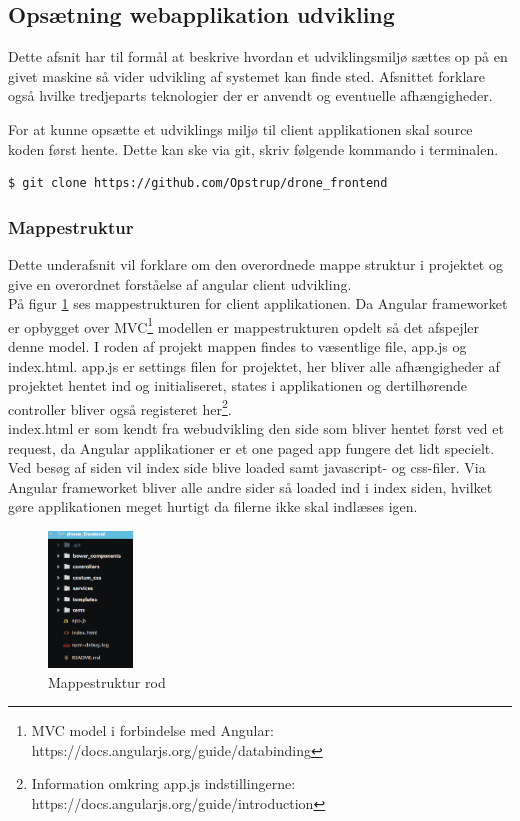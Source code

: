 \subsection{Opsætning webapplikation udvikling}
Dette afsnit har til formål at beskrive hvordan et udviklingsmiljø sættes op på en givet maskine så vider udvikling af systemet kan finde sted. Afsnittet forklare også hvilke tredjeparts teknologier der er anvendt og eventuelle afhængigheder.

For at kunne opsætte et udviklings miljø til client applikationen skal source koden først hente. Dette kan ske via git, skriv følgende kommando i terminalen.

\begin{lstlisting}[language=bash]
	$ git clone https://github.com/Opstrup/drone_frontend
\end{lstlisting}

\subsubsection{Mappestruktur}
Dette underafsnit vil forklare om den overordnede mappe struktur i projektet og give en overordnet forståelse af angular client udvikling. \\

På figur \ref{fig:mappestruktur_client} ses mappestrukturen for client applikationen. Da Angular frameworket er opbygget over MVC\footnote{MVC model i forbindelse med Angular: https://docs.angularjs.org/guide/databinding} modellen er mappestrukturen opdelt så det afspejler denne model. I roden af projekt mappen findes to væsentlige file, app.js og index.html. app.js er settings filen for projektet, her bliver alle afhængigheder af projektet hentet ind og initialiseret, states i applikationen og dertilhørende controller bliver også registeret her\footnote{Information omkring app.js indstillingerne: https://docs.angularjs.org/guide/introduction}.\\
index.html er som kendt fra webudvikling den side som bliver hentet først ved et request, da Angular applikationer er et one paged app fungere det lidt specielt. Ved besøg af siden vil index side blive loaded samt javascript- og css-filer. Via Angular frameworket bliver alle andre sider så loaded ind i index siden, hvilket gøre applikationen meget hurtigt da filerne ikke skal indlæses igen.

\begin{figure}[H]
	\centering
	\includegraphics[width=0.2\textwidth]{Billeder/implementation/mappestruktur_client.png}
	\caption{Mappestruktur rod}
	\label{fig:mappestruktur_client}
\end{figure}


